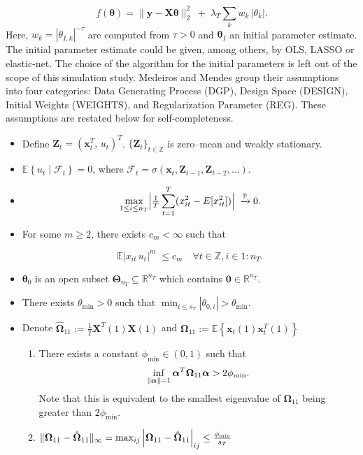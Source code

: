 \documentclass[10pt,a4paper,oneside]{article}
\newcommand{\Z}{\mathbb{Z}}
\newcommand{\R}{\mathbb{R}}
\newcommand{\Prob}{\mathbb{P}}
\newcommand{\E}{\mathbb{E}}
\newcommand{\SigAl}{\mathcal{F}}
\DeclarePairedDelimiter{\norma}{\lVert}{\rVert} %
\begin{document}
\[
        f(\boldsymbol{\theta}) = \bigl\|\mathbf{y} -  \mathbf{X}\boldsymbol{\theta}\bigr\|_2^2
        \;+\;\lambda_T\sum_{k} w_k\,|\theta_k|.
\]
Here, $w_k = \left| \theta_{I, k} \right|^{-\tau}$ are computed from $\tau > 0$ and $\boldsymbol{\theta}_I$ an initial parameter estimate. The initial parameter estimate could be given, among others, by OLS, LASSO or elastic-net. The choice of the algorithm for the initial parameters is left out of the scope of this simulation study. Medeiros and Mendes group their assumptions into four categories: Data Generating Process (DGP), Design Space (DESIGN), Initial Weights (WEIGHTS), and Regularization Parameter (REG). These assumptions are restated below for self-completeness.


\begin{itemize}
  \item[(DGP1)] Define $\mathbf{Z}_t = (\mathbf{x}_t^T,\,u_t)^T$. $\{\mathbf{Z}_t\}_{t \in \Z}$ is zero–mean and weakly stationary.
  \item[(DGP2)] $\E \left\{ u_t\mid \SigAl_t\right\}=0$, where $\SigAl_t=\sigma(\mathbf{x}_t, \mathbf{Z}_{t-1}, \mathbf{Z}_{t-2},\dots)$.
  \item[(DGP3)] 
  \[
     \max_{1\le i\le n_T}\Bigl|\tfrac1T\sum_{t=1}^T(x_{it}^2 - E[x_{it}^2])\Bigr|\;\xrightarrow[]{\Prob}0.
  \]
  \item[(DGP4)] For some $m \geq 2$, there exists $c_m < \infty$ such that

  \[
     \E\bigl|x_{it}\,u_t\bigr|^m\;\le c_m \quad \forall t\in \Z, i \in1:n_T.
  \]

  \item[(DESIGN1)] $\mathbf{\theta}_0$ is an open subset $\boldsymbol{\Theta}_{n_T} \subseteq \R^{n_T}$ which contains $\mathbf{0} \in \R^{n_T}$.
  \item[(DESIGN2)] There exists $\theta_{\min} > 0$ such that $\min_{i\le s_T}|\theta_{0,i}|>\theta_{\min}$.
  \item[(DESIGN3)] Denote $\hat{\boldsymbol{\Omega}}_{11} := \frac{1}{T}\mathbf{X}^T(1) \mathbf{X}(1)$ and $\boldsymbol{\Omega}_{11} := \E \left\{ \mathbf{x}_t(1) \mathbf{x}^T_t(1) \right\}$
    \begin{enumerate}
      \item[(a)] There exists a constant $\phi_{\min} \in (0, 1)$ such that
      $$
      \inf_{\norma{\boldsymbol{\alpha}} = 1} \boldsymbol{\alpha}^T \boldsymbol{\Omega}_{11} \boldsymbol{\alpha} > 2 \phi_{\min}.
      $$
      Note that this is equivalent to the smallest eigenvalue of $\boldsymbol{\Omega}_{11}$ being greater than $2\phi_{\min}$.
      \item[(b)] $\norma{\boldsymbol{\Omega}_{11} - \hat{\boldsymbol{\Omega}}_{11}}_{\infty} = \max_{ij} \left| \boldsymbol{\Omega}_{11} - \hat{\boldsymbol{\Omega}}_{11}\right|_{ij} \leq \frac{\phi_{\min}}{s_T}$


\end{enumerate}
\end{itemize}
\end{document}
